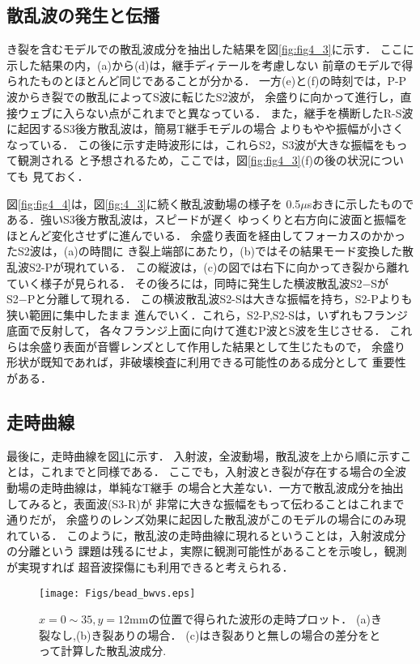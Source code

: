 \subsection{散乱波の発生と伝播}
き裂を含むモデルでの散乱波成分を抽出した結果を図\ref{fig:fig4_3}に示す．
ここに示した結果の内，(a)から(d)は，継手ディテールを考慮しない
前章のモデルで得られたものとほとんど同じであることが分かる．
一方(e)と(f)の時刻では，P-P波からき裂での散乱によってS波に転じたS2波が，
余盛りに向かって進行し，直接ウェブに入らない点がこれまでと異なっている．
また，継手を横断したR-S波に起因するS3後方散乱波は，簡易T継手モデルの場合
よりもやや振幅が小さくなっている．
この後に示す走時波形には，これらS2，S3波が大きな振幅をもって観測される
と予想されるため，ここでは，図\ref{fig:fig4_3}(f)の後の状況についても
見ておく．

図\ref{fig:fig4_4}は，図\ref{fig:4_3}に続く散乱波動場の様子を
0.5$\mu$sおきに示したものである．強いS3後方散乱波は，スピードが遅く
ゆっくりと右方向に波面と振幅をほとんど変化させずに進んでいる．
余盛り表面を経由してフォーカスのかかったS2波は，(a)の時間に
き裂上端部にあたり，(b)ではその結果モード変換した散乱波S2-Pが現れている．
この縦波は，(c)の図では右下に向かってき裂から離れていく様子が見られる．
その後ろには，同時に発生した横波散乱波S2−SがS2−Pと分離して現れる．
この横波散乱波S2-Sは大きな振幅を持ち，S2-Pよりも狭い範囲に集中したまま
進んでいく．これら，S2-P,S2-Sは，いずれもフランジ底面で反射して，
各々フランジ上面に向けて進むP波とS波を生じさせる．
これらは余盛り表面が音響レンズとして作用した結果として生じたもので，
余盛り形状が既知であれば，非破壊検査に利用できる可能性のある成分として
重要性がある．
\subsection{走時曲線}
最後に，走時曲線を図\ref{fig:fig4_5}に示す．
入射波，全波動場，散乱波を上から順に示すことは，これまでと同様である．
ここでも，入射波とき裂が存在する場合の全波動場の走時曲線は，単純なT継手
の場合と大差ない．一方で散乱波成分を抽出してみると，表面波(S3-R)が
非常に大きな振幅をもって伝わることはこれまで通りだが，
余盛りのレンズ効果に起因した散乱波がこのモデルの場合にのみ現れている．
このように，散乱波の走時曲線に現れるということは，入射波成分の分離という
課題は残るにせよ，実際に観測可能性があることを示唆し，観測が実現すれば
超音波探傷にも利用できると考えられる．
\begin{figure}[h]
	\begin{center}
	\texttt{[image: Figs/bead\_bwvs.eps]} 
	\end{center}
	\caption{
		$x=0\sim35, y=12$mmの位置で得られた波形の走時プロット．
		(a)き裂なし,(b)き裂ありの場合．
		(c)はき裂ありと無しの場合の差分をとって計算した散乱波成分.
	} 
	\label{fig:fig4_5}
\end{figure}
